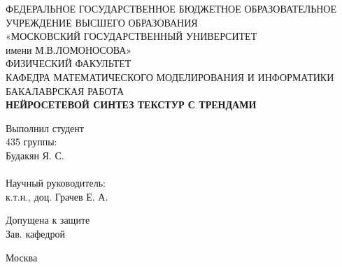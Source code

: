 \begin{titlepage} %
	
	\begin{center}
		\small{ФЕДЕРАЛЬНОЕ ГОСУДАРСТВЕННОЕ БЮДЖЕТНОЕ ОБРАЗОВАТЕЛЬНОЕ}\\ 
		УЧРЕЖДЕНИЕ ВЫСШЕГО ОБРАЗОВАНИЯ\\
		«МОСКОВСКИЙ ГОСУДАРСТВЕННЫЙ УНИВЕРСИТЕТ\\
		имени М.В.ЛОМОНОСОВА»\\
		\hfill \break
		ФИЗИЧЕСКИЙ ФАКУЛЬТЕТ \\
		\hfill \break
		КАФЕДРА МАТЕМАТИЧЕСКОГО МОДЕЛИРОВАНИЯ И ИНФОРМАТИКИ\\
		\hfill \break
		\hfill \break
		\hfill \break
		\hfill \break
		БАКАЛАВРСКАЯ РАБОТА\\
		\hfill \break
		\textbf{НЕЙРОСЕТЕВОЙ СИНТЕЗ ТЕКСТУР С ТРЕНДАМИ}\\
	\end{center}
	
	\hfill \break

	\begin{flushright}
		Выполнил студент \\
		435 группы:\\
		Будакян Я. С.\\
		\underline{\hspace{3cm}}\\
		\hfill \break
		Научный руководитель: \\
		к.т.н., доц. Грачев Е. А.\\
		\underline{\hspace{3cm}}
	\end{flushright}
	
	\begin{flushleft}
		Допущена к защите\\
		Зав. кафедрой \underline{\hspace{3cm}}\\
	\end{flushleft}
	\hfill \break
	\begin{center}
		Москва \\
		\hfill {} 
	\end{center}
	
	\thispagestyle{empty} %
	

\end{titlepage}  %